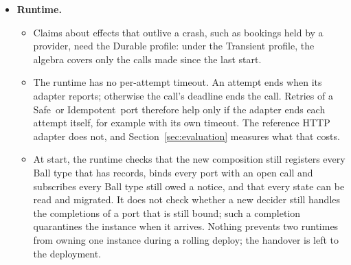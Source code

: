 \documentclass[11pt]{article}
\theoremstyle{definition}
\theoremstyle{plain}
\newcommand{\Safe}{\textsf{Safe}}
\newcommand{\Idem}{\textsf{Idempotent}}
\begin{document}
\begin{itemize}[leftmargin=*]
\begin{itemize}[nosep]
    \item The four change requests are few. Three concern an unreliable external service, where Ballarch's runtime is meant to help, and none changes only business rules or data. Code lines and units touched are proxies for the effort of a change; developer effort and review time were not measured. The patches change only the scenario-A designs; the scenario-B variants would need further edits, which are not in the counts.
    \item The firmware reference has two examples and the RTL reference two blocks, each checked in simulation against a model of its device; the RTL blocks are also checked on their netlists. The checks are bounded: by default, the firmware explorations place one fault per run and choose the link fates of the first six or seven transmissions, and the RTL benches combine nine fates for the first two attempts of a command. These references check the call-protocol rules and the algebra, not every rule (Table~\ref{tab:rules}).
    \item The algebra is checked at each level, and at the service level also for a composite of composites (the itinerary), but no reference composes levels, for instance firmware that drives the RTL block as a Ball behind a port. The closure corollary covers such composition, but no check exercises it.
    \item The examples that check the algebra by exploration are small: two bookings, two trips of two bookings, two valves and a two-step hardware operation.
  \end{itemize}
  \item \textbf{Runtime.}
  \begin{itemize}[nosep]
    \item Claims about effects that outlive a crash, such as bookings held by a provider, need the Durable profile: under the Transient profile, the algebra covers only the calls made since the last start.
    \item The runtime has no per-attempt timeout. An attempt ends when its adapter reports; otherwise the call's deadline ends the call. Retries of a \Safe\ or \Idem\ port therefore help only if the adapter ends each attempt itself, for example with its own timeout. The reference HTTP adapter does not, and Section~\ref{sec:evaluation} measures what that costs.
    \item At start, the runtime checks that the new composition still registers every Ball type that has records, binds every port with an open call and subscribes every Ball type still owed a notice, and that every state can be read and migrated. It does not check whether a new decider still handles the completions of a port that is still bound; such a completion quarantines the instance when it arrives. Nothing prevents two runtimes from owning one instance during a rolling deploy; the handover is left to the deployment.

\end{itemize}
\end{itemize}
\end{document}
